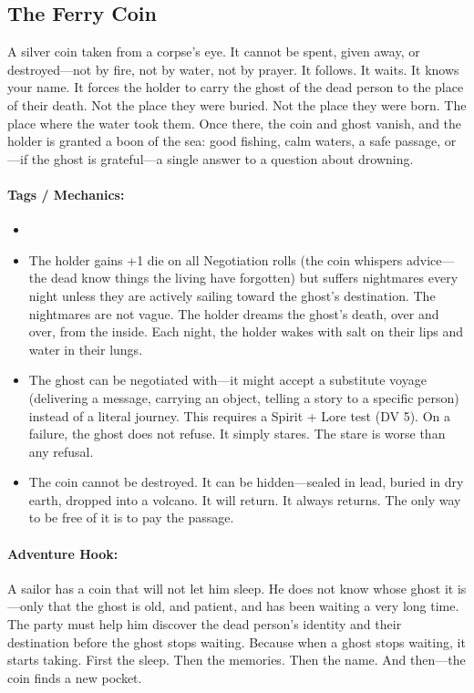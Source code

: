 \subsection*{The Ferry Coin}

A silver coin taken from a corpse's eye. It cannot be spent, given away, or destroyed---not by fire, not by water, not by prayer. It follows. It waits. It knows your name. It forces the holder to carry the ghost of the dead person to the place of their death. Not the place they were buried. Not the place they were born. The place where the water took them. Once there, the coin and ghost vanish, and the holder is granted a boon of the sea: good fishing, calm waters, a safe passage, or---if the ghost is grateful---a single answer to a question about drowning.

\paragraph{Tags / Mechanics:}
\begin{itemize}
\item [CURSE] [SACRIFICE] [TRUTH]
\item The holder gains +1 die on all Negotiation rolls (the coin whispers advice---the dead know things the living have forgotten) but suffers nightmares every night unless they are actively sailing toward the ghost's destination. The nightmares are not vague. The holder dreams the ghost's death, over and over, from the inside. Each night, the holder wakes with salt on their lips and water in their lungs.
\item The ghost can be negotiated with---it might accept a substitute voyage (delivering a message, carrying an object, telling a story to a specific person) instead of a literal journey. This requires a Spirit + Lore test (DV 5). On a failure, the ghost does not refuse. It simply stares. The stare is worse than any refusal.
\item The coin cannot be destroyed. It can be hidden---sealed in lead, buried in dry earth, dropped into a volcano. It will return. It always returns. The only way to be free of it is to pay the passage.
\end{itemize}

\paragraph{Adventure Hook:}
A sailor has a coin that will not let him sleep. He does not know whose ghost it is---only that the ghost is old, and patient, and has been waiting a very long time. The party must help him discover the dead person's identity and their destination before the ghost stops waiting. Because when a ghost stops waiting, it starts taking. First the sleep. Then the memories. Then the name. And then---the coin finds a new pocket.

